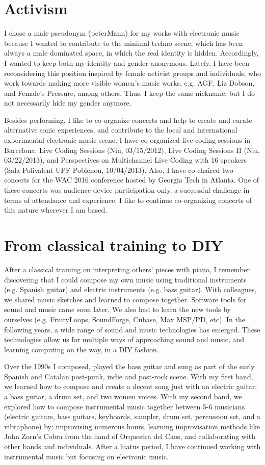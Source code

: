\documentclass[10pt, a4paper]{article}
\begin{document}
\section*{Activism}

I chose a male pseudonym (peterMann) for my works with electronic music because I wanted to contribute to the minimal techno scene, which has been always a male dominated space, in which the real identity is hidden. Accordingly, I wanted to keep both my identity and gender anonymous. Lately, I have been reconsidering this position inspired by female activist groups and individuals, who work towards making more visible women's music works, e.g. AGF, Liz Dobson, and Female's Pressure, among others. Thus, I keep the same nickname, but I do not necessarily hide my gender anymore.

Besides performing, I like to co-organize concerts and help to create and curate alternative sonic experiences, and contribute to the local and international experimental electronic music scene. I have co-organized live coding sessions in Barcelona: Live Coding Sessions (Niu, 03/15/2012), Live Coding Sessions II (Niu, 03/22/2013), and Perspectives on Multichannel Live Coding with 16 speakers (Sala Polivalent UPF Poblenou, 10/04/2013). Also, I have co-chaired two concerts for the WAC 2016 conference hosted by Georgia Tech in Atlanta. One of these concerts was audience device participation only, a successful challenge in terms of attendance and experience. I like to continue co-organizing concerts of this nature wherever I am based.

\section*{From classical training to DIY}

After a classical training on interpreting others' pieces with piano, I remember discovering that I could compose my own music using traditional instruments (e.g. Spanish guitar) and electric instruments (e.g. bass guitar). With colleagues, we shared music sketches and learned to compose together. Software tools for sound and music came soon later. We also had to learn the new tools by ourselves (e.g. FruityLoops, SoundForge, Cubase, Max MSP/PD, etc). In the following years, a wide range of sound and music technologies has emerged. These technologies allow us for multiple ways of approaching sound and music, and learning computing on the way, in a DIY fashion.   

Over the 1990s I composed, played the bass guitar and sung as part of the early Spanish and Catalan post-punk, indie and post-rock scene. With my first band, we learned how to compose and create a decent song just with an electric guitar, a bass guitar, a drum set, and two women voices. With my second band, we explored how to compose instrumental music together between 5-6 musicians (electric guitars, bass guitars, keyboards, sampler, drum set, percussion set, and a vibraphone) by: improvising numerous hours, learning improvisation methods like John Zorn's Cobra from the hand of Orquestra del Caos, and collaborating with other bands and individuals. After a hiatus period, I have continued working with instrumental music but focusing on electronic music. 
\end{document}
